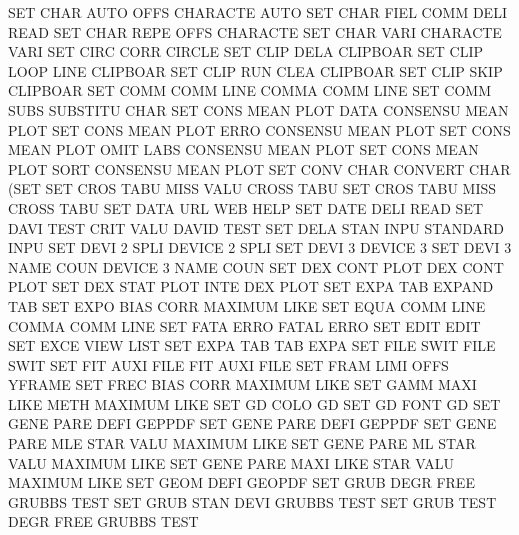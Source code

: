 SET      CHAR AUTO OFFS                 CHARACTE AUTO
SET      CHAR FIEL COMM DELI            READ
SET      CHAR REPE OFFS                 CHARACTE
SET      CHAR VARI                      CHARACTE VARI
SET      CIRC CORR                      CIRCLE
SET      CLIP DELA                      CLIPBOAR
SET      CLIP LOOP LINE                 CLIPBOAR
SET      CLIP RUN  CLEA                 CLIPBOAR
SET      CLIP SKIP                      CLIPBOAR
SET      COMM COMM LINE                 COMMA    COMM LINE
SET      COMM SUBS                      SUBSTITU CHAR
SET      CONS MEAN PLOT DATA            CONSENSU MEAN PLOT
SET      CONS MEAN PLOT ERRO            CONSENSU MEAN PLOT
SET      CONS MEAN PLOT OMIT LABS       CONSENSU MEAN PLOT
SET      CONS MEAN PLOT SORT            CONSENSU MEAN PLOT
SET      CONV CHAR                      CONVERT  CHAR (SET
SET      CROS TABU MISS VALU            CROSS    TABU
SET      CROS TABU MISS                 CROSS    TABU
SET      DATA URL                       WEB      HELP
SET      DATE DELI                      READ
SET      DAVI TEST CRIT VALU            DAVID    TEST
SET      DELA STAN INPU                 STANDARD INPU
SET      DEVI 2    SPLI                 DEVICE   2    SPLI 
SET      DEVI 3                         DEVICE   3
SET      DEVI 3    NAME COUN            DEVICE   3    NAME COUN
SET      DEX  CONT PLOT                 DEX      CONT PLOT
SET      DEX  STAT PLOT INTE            DEX      PLOT
SET      EXPA TAB                       EXPAND   TAB
SET      EXPO BIAS CORR                 MAXIMUM  LIKE
SET      EQUA COMM LINE                 COMMA    COMM LINE
SET      FATA ERRO                      FATAL    ERRO
SET      EDIT                           EDIT
SET      EXCE VIEW                      LIST
SET      EXPA TAB                       TAB      EXPA
SET      FILE SWIT                      FILE     SWIT
SET      FIT  AUXI FILE                 FIT      AUXI FILE
SET      FRAM LIMI OFFS                 YFRAME
SET      FREC BIAS CORR                 MAXIMUM  LIKE
SET      GAMM MAXI LIKE METH            MAXIMUM  LIKE
SET      GD   COLO                      GD
SET      GD   FONT                      GD
SET      GENE PARE DEFI                 GEPPDF
SET      GENE PARE DEFI                 GEPPDF
SET      GENE PARE MLE  STAR VALU       MAXIMUM  LIKE
SET      GENE PARE ML   STAR VALU       MAXIMUM  LIKE
SET      GENE PARE MAXI LIKE STAR VALU  MAXIMUM  LIKE
SET      GEOM DEFI                      GEOPDF
SET      GRUB DEGR FREE                 GRUBBS   TEST
SET      GRUB STAN DEVI                 GRUBBS   TEST
SET      GRUB TEST DEGR FREE            GRUBBS   TEST
